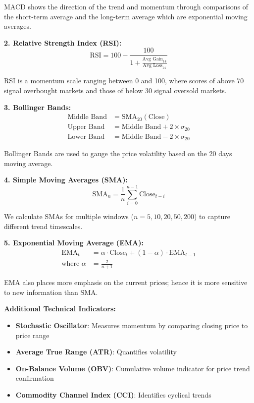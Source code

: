 MACD shows the direction of the trend and momentum through comparisons of the short-term average and the long-term average which are exponential moving averages.

\textbf{2. Relative Strength Index (RSI):}
\begin{equation}
\text{RSI} = 100 - \frac{100}{1 + \frac{\text{Avg Gain}_{14}}{\text{Avg Loss}_{14}}}
\end{equation}

RSI is a momentum scale ranging between 0 and 100, where scores of above 70 signal overbought markets and those of below 30 signal oversold markets.

\textbf{3. Bollinger Bands:}
\begin{align}
\text{Middle Band} &= \text{SMA}_{20}(\text{Close}) \\
\text{Upper Band} &= \text{Middle Band} + 2 \times \sigma_{20} \\
\text{Lower Band} &= \text{Middle Band} - 2 \times \sigma_{20}
\end{align}

Bollinger Bands are used to gauge the price volatility based on the 20 days moving average.

\textbf{4. Simple Moving Averages (SMA):}
\begin{equation}
\text{SMA}_n = \frac{1}{n} \sum_{i=0}^{n-1} \text{Close}_{t-i}
\end{equation}

We calculate SMAs for multiple windows ($n = 5, 10, 20, 50, 200$) to capture different trend timescales.

\textbf{5. Exponential Moving Average (EMA):}
\begin{align}
\text{EMA}_t &= \alpha \cdot \text{Close}_t + (1-\alpha) \cdot \text{EMA}_{t-1} \\
\text{where } \alpha &= \frac{2}{n+1}
\end{align}

EMA also places more emphasis on the current prices; hence it is more sensitive to new information than SMA.

\textbf{Additional Technical Indicators:}
\begin{itemize}
    \item \textbf{Stochastic Oscillator}: Measures momentum by comparing closing price to price range
    \item \textbf{Average True Range (ATR)}: Quantifies volatility
    \item \textbf{On-Balance Volume (OBV)}: Cumulative volume indicator for price trend confirmation
    \item \textbf{Commodity Channel Index (CCI)}: Identifies cyclical trends
\end{itemize}

